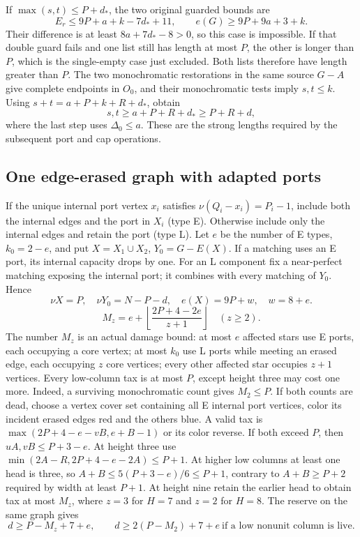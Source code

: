\documentclass[11pt,a4paper]{article}
\newcommand{\floor}[1]{\left\lfloor#1\right\rfloor}
\theoremstyle{definition}
\begin{document}
If \(\max(s,t)\le P+d_*\), the two original guarded bounds are
\[
E_r\le9P+a+k-7d_*+11,\qquad
e(G)\ge9P+9a+3+k.
\]
Their difference is at least \(8a+7d_*-8>0\), so this case is impossible.
If that double guard fails and one list still has length at most \(P\), the other is longer than \(P\), which is the single-empty case just excluded.
Both lists therefore have length greater than \(P\).
The two monochromatic restorations in the same source \(G-A\) give complete endpoints in \(O_0\), and their monochromatic tests imply \(s,t\le k\).
Using \(s+t=a+P+k+R+d_*\), obtain
\begin{equation}\label{eq:D9length}
s,t\ge a+P+R+d_*\ge P+R+d,
\end{equation}
where the last step uses \(\Delta_0\le a\). These are the strong lengths required by the subsequent port and cap operations.
\subsection{One edge-erased graph with adapted ports}
If the unique internal port vertex $x_i$ satisfies $\nu(Q_i-x_i)=P_i-1$, include both the internal edges and the port in $X_i$ (type E). Otherwise include only the internal edges and retain the port (type L). Let $e$ be the number of E types, $k_0=2-e$, and put
$X=X_1\cup X_2$, $Y_0=G-E(X)$.
If a matching uses an E port, its internal capacity drops by one. For an L component fix a near-perfect matching exposing the internal port; it combines with every matching of $Y_0$. Hence
\[
\nu X=P,\quad \nu Y_0=N-P-d,\quad e(X)=9P+w,\quad w=8+e.
\]
\[
M_z=e+\floor{\frac{2P+4-2e}{z+1}}\quad(z\ge2).
\]
The number $M_z$ is an actual damage bound: at most $e$ affected stars use E ports, each occupying a core vertex; at most $k_0$ use L ports while meeting an erased edge, each occupying $z$ core vertices; every other affected star occupies $z+1$ vertices. Every low-column tax is at most $P$, except height three may cost one more. Indeed, a surviving monochromatic count gives $M_2\le P$. If both counts are dead, choose a vertex cover set containing all E internal port vertices, color its incident erased edges red and the others blue. A valid tax is
$\max(2P+4-e-vB,e+B-1)$ or its color reverse.
If both exceed $P$, then $uA,vB\le P+3-e$.
At height three use
$\min(2A-R,2P+4-e-2A)\le P+1$.
At higher low columns at least one head is three, so
$A+B\le5(P+3-e)/6\le P+1$,
contrary to $A+B\ge P+2$ required by width at least $P+1$.
At height nine retain the earlier head to obtain tax at most $M_z$, where $z=3$ for $H=7$ and $z=2$ for $H=8$. The reserve on the same graph gives
\[
d\ge P-M_z+7+e,\qquad
d\ge2(P-M_2)+7+e
\ \text{if a low nonunit column is live}.
\]
\end{document}
